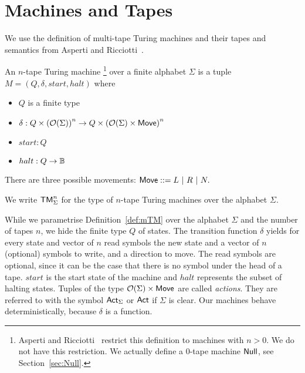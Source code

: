 \section{Machines and Tapes}
\label{sec:machine-tapes}



We use the definition of multi-tape Turing machines and their tapes and semantics from Asperti and Ricciotti~\cite{asperti2015}.

\begin{definition}
  \label{def:mTM}
  An $n$-tape Turing machine%
  \footnote{Asperti and Ricciotti~\cite{asperti2015} restrict this definition to machines with $n>0$.  We do not have this restriction.  We actually
    define a $0$-tape machine $\mathsf{Null}$, see Section~\ref{sec:Null}.} %
  over a finite alphabet $\Sigma$ is a tuple $M = (Q, \delta, start, halt)$ where
  \begin{itemize}
  \item $Q$ is a finite type
  \item $\delta : Q \times \left(\mathcal{O}(\Sigma)\right)^n \rightarrow Q \times \left(\mathcal{O}(\Sigma) \times \mathsf{Move}\right)^n$
  \item $start:Q$
  \item $halt : Q \rightarrow \mathbb{B}$ 
  \end{itemize}
  There are three possible movements: $\mathsf{Move} ::= L ~|~ R ~|~ N.$
\end{definition}

We write $\mathsf{TM}_\Sigma^n$ for the type of $n$-tape Turing machines over the alphabet $\Sigma$.

While we parametrise Definition~\ref{def:mTM} over the alphabet $\Sigma$ and the number of tapes $n$, we hide the finite type $Q$ of states.  The
transition function $\delta$ yields for every state and vector of $n$ read symbols the new state and a vector of $n$ (optional) symbols to write, and
a direction to move.  The read symbols are optional, since it can be the case that there is no symbol under the head of a tape.  $start$ is the start
state of the machine and $halt$ represents the subset of halting states.  Tuples of the type $\mathcal{O}(\Sigma) \times \mathsf{Move}$ are called
\textit{actions}.  They are referred to with the symbol $\mathsf{Act}_\Sigma$ or $\mathsf{Act}$ if $\Sigma$ is clear.  Our machines behave deterministically,
because $\delta$ is a function.

